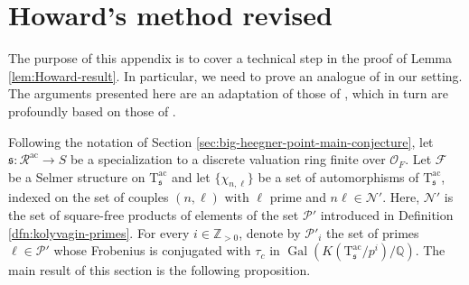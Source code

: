 \documentclass[12pt,reqno]{amsart}
\theoremstyle{definition}
\theoremstyle{remark}
\newcommand{\numberset}{\mathbb}
\newcommand{\Q}{\numberset{Q}}
\newcommand{\Z}{\numberset{Z}}
\newcommand{\OF}{\mathcal{O}_F}
\newcommand{\T}{\boldsymbol{\mathrm{T}}}
\newcommand{\calR}{\mathcal{R}}
\DeclareMathOperator{\Gal}{Gal}
\newcommand{\ac}{\mathrm{ac}}
\newcommand{\sfrak}{\mathfrak{s}}
\begin{document}
\section{Howard's method revised}\label{sec:howards-method-revised}

The purpose of this appendix is to cover a technical step in the proof of Lemma \ref{lem:Howard-result}. In particular, we need to prove an analogue of \cite[Theorem 1.6.1]{Howard04:heegner-point-kolyvagin-system} in our setting. The arguments presented here are an adaptation of those of \cite[§2.12]{mastella-zerman2025:anticyclotomic}, which in turn are profoundly based on those of \cite[§1.6]{Howard04:heegner-point-kolyvagin-system}.

Following the notation of Section \ref{sec:big-heegner-point-main-conjecture}, let $\sfrak\colon \calR^{\ac}\to S$ be a specialization to a discrete valuation ring finite over $\OF$. Let $\mathcal{F}$ be a Selmer structure on $\T^\ac_\sfrak$ and let $\{\chi_{n,\ell}\}$ be a set of automorphisms of $\T^\ac_\sfrak$, indexed on the set of couples $(n,\ell)$ with $\ell$ prime and $n\ell\in\mathcal{N}'$. Here, $\mathcal{N}'$ is the set of square-free products of elements of the set $\mathcal{P}'$ introduced in Definition \ref{dfn:kolyvagin-primes}. For every $i\in\Z_{>0}$, denote by $\mathcal{P}'_i$ the set of primes $\ell\in\mathcal{P}'$ whose Frobenius is conjugated with $\tau_c$ in $\Gal(K(\T^\ac_\sfrak/p^i)/\Q)$. The main result of this section is the following proposition.
\end{document}
